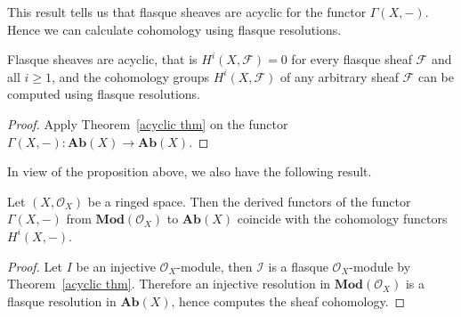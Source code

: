 This result tells us that flasque sheaves are acyclic for the functor $\Gamma(X,-)$. Hence we can calculate cohomology using flasque resolutions. 
\begin{proposition}\label{flasque is acyclic}
Flasque sheaves are acyclic, that is $H^i(X,\mathscr{F})=0$ for every flasque
sheaf $\mathscr{F}$ and all $i\geq1$, and the cohomology groups $H^i(X,\mathscr{F})$ of any arbitrary sheaf $\mathscr{F}$ can be computed using flasque resolutions.
\end{proposition}
\begin{proof}
Apply Theorem~\ref{acyclic thm} on the functor $\Gamma(X,-):\mathbf{Ab}(X)\to\mathbf{Ab}(X)$.
\end{proof}
In view of the proposition above, we also have the following result.
\begin{proposition}
Let $(X,\mathscr{O}_X)$ be a ringed space. Then the derived functors of the functor $\Gamma(X,-)$ from $\mathbf{Mod}(\mathscr{O}_X)$ to $\mathbf{Ab}(X)$ coincide with the cohomology functors $H^i(X,-)$.
\end{proposition}
\begin{proof}
Let $I$ be an injective $\mathscr{O}_X$-module, then $\mathscr{I}$ is a flasque $\mathscr{O}_X$-module by Theorem~\ref{acyclic thm}. Therefore an injective resolution in $\mathbf{Mod}(\mathscr{O}_X)$ is a flasque resolution in $\mathbf{Ab}(X)$, hence computes the sheaf cohomology.
\end{proof}
